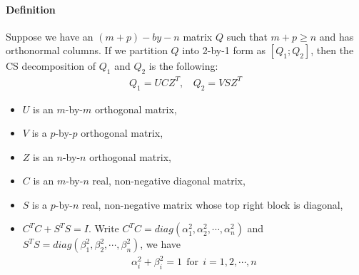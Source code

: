     \paragraph{Definition} Suppose we have an $(m+p)-by-n$ matrix $Q$ such that $m+p \geq n$ and has orthonormal columns. If we partition $Q$ into 2-by-1 form as $[Q_1; Q_2]$, then the CS decomposition of $Q_1$ and $Q_2$ is the following:
    \begin{align}
        Q_1 = UCZ^T,\ \  \ \ Q_2 = VSZ^T
    \end{align}
    \begin{itemize}
        \item $U$ is an $m$-by-$m$ orthogonal matrix,
        \item $V$ is a $p$-by-$p$ orthogonal matrix, 
        \item $Z$ is an $n$-by-$n$ orthogonal matrix, 
        \item $C$ is an $m$-by-$n$ real, non-negative diagonal matrix,
        \item $S$ is a $p$-by-$n$ real, non-negative matrix whose top right block is diagonal,
        \item $C^{T}C + S^{T}S = I$. Write $C^{T}C = diag(\alpha_1^{2}, \alpha_2^{2}, \cdots, \alpha_n^{2})$ and $S^{T}S = diag(\beta_1^{2}, \beta_2^{2}, \cdots, \beta_n^{2})$, we have 
        \begin{align} \label{cosine-sine}
            \alpha_i^{2} + \beta_i^{2} = 1 \ \  \text{for} \ \ i = 1,2,\cdots,n
        \end{align}
    \end{itemize}
    

